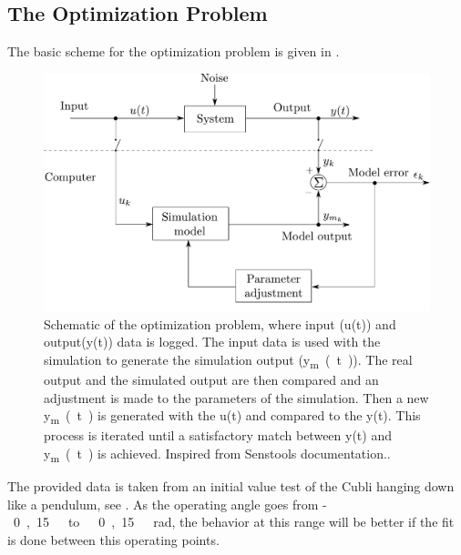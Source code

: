 \subsection{The Optimization Problem}
The basic scheme for the optimization problem is given in .
%
\begin{figure}[H]
	\centering
	\includegraphics[scale=0.4]{figures/senstoolsModelOptimizationHM}
%	
	\caption{Schematic of the optimization problem, where input (u(t)) and output(y(t)) data is logged. The input data is used with the simulation to generate the simulation output (\si{y_{m}(t)}). The real output and the simulated output are then compared and an adjustment is made to the parameters of the simulation. Then a new \si{y_{m}(t)} is generated with the u(t) and compared to the y(t). This process is iterated until a satisfactory match between y(t) and \si{y_{m}(t)} is achieved. Inspired from Senstools documentation.\cite{Senstools}.}
	\label{SensToolSchema}
\end{figure}
%
The provided data is taken from an initial value test of the Cubli hanging down like a pendulum, see .
As the operating angle goes from \si{-0,15\ to\ 0,15\ rad}, the behavior at this range will be better if the fit is done between this operating points. 

